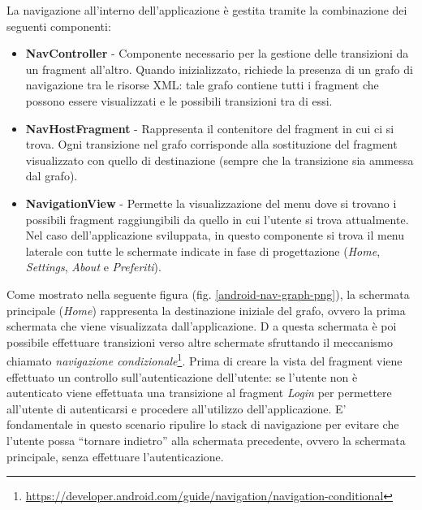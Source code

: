 La navigazione all'interno dell'applicazione è gestita tramite la combinazione dei seguenti componenti:

\begin{itemize}
    \item \textbf{NavController} - Componente necessario per la gestione delle transizioni da un fragment all'altro. Quando inizializzato, richiede la presenza di un grafo di navigazione tra le risorse XML: tale grafo contiene tutti i fragment che possono essere visualizzati e le possibili transizioni tra di essi.
    
    \item \textbf{NavHostFragment} - Rappresenta il contenitore del fragment in cui ci si trova. Ogni transizione nel grafo corrisponde alla sostituzione del fragment visualizzato con quello di destinazione (sempre che la transizione sia ammessa dal grafo).
    
    \item \textbf{NavigationView} - Permette la visualizzazione del menu dove si trovano i possibili fragment raggiungibili da quello in cui l'utente si trova attualmente. Nel caso dell'applicazione sviluppata, in questo componente si trova il menu laterale con tutte le schermate indicate in fase di progettazione (\textit{Home}, \textit{Settings}, \textit{About} e \textit{Preferiti}).
\end{itemize}

Come mostrato nella seguente figura (fig. \ref{android-nav-graph-png}), 
la schermata principale (\textit{Home}) rappresenta la destinazione iniziale del grafo, 
ovvero la prima schermata che viene visualizzata dall'applicazione. D
a questa schermata è poi possibile effettuare transizioni verso altre schermate sfruttando il meccanismo chiamato \textit{navigazione condizionale}\footnote{\href{https://developer.android.com/guide/navigation/navigation-conditional}{https://developer.android.com/guide/navigation/navigation-conditional}}. 
Prima di creare la vista del fragment viene effettuato un controllo sull'autenticazione dell'utente: 
se l'utente non è autenticato viene effettuata una transizione al fragment \textit{Login} per permettere all'utente di autenticarsi e procedere all'utilizzo dell'applicazione. 
E' fondamentale in questo scenario ripulire lo stack di navigazione per evitare che l'utente possa ``tornare indietro'' alla schermata precedente, 
ovvero la schermata principale, 
senza effettuare l'autenticazione.

